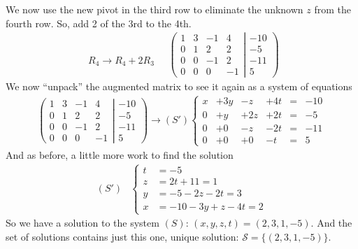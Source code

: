 We now use the new pivot in the third row to eliminate the unknown $z$ from the fourth
row. So, add 2 of the 3rd to the 4th.
\begin{align*}
\begin{array}{l}
   \\
   \\
   \\
 R_4 \to R_4 + 2R_3
\end{array}
\quad
\left(
	\begin{matrix}
	   1 &   3 & -1 &   4 \\
	   0 &   1 &  2 &   2 \\
	   0 &   0 & -1 &   2 \\
	   0 &   0 &  0 &  -1
	\end{matrix}
  \left|
	\begin{matrix}
	 -10 \\
	  -5 \\
	 -11 \\
	   5
	\end{matrix}
  \right.
\right)
\end{align*}
We now ``unpack'' the augmented matrix to see it again as a system of equations
\begin{align*}
\left(
	\begin{matrix}
	   1 &   3 & -1 &   4 \\
	   0 &   1 &  2 &   2 \\
	   0 &   0 & -1 &   2 \\
	   0 &   0 &  0 &  -1
	\end{matrix}
  \left|
	\begin{matrix}
	 -10 \\
	  -5 \\
	 -11 \\
	   5
	\end{matrix}
  \right.
\right)
\longrightarrow
(S')
\left\{
\begin{matrix}
    x &+ 3y &-  z &+ 4t &=&  -10 \\
    0 &+  y &+ 2z &+ 2t &=&   -5 \\
    0 &+  0 &-  z &- 2t &=&  -11 \\
    0 &+  0 &+  0 &-  t &=&    5
\end{matrix}
\right.
\end{align*}
And as before, a little more work to find the solution
\begin{align*}
(S')
&\left\{
\begin{array}{ll}
   t &=  -5 \\
   z &=  2t +11 = 1\\
   y &=  -5 -2z - 2t = 3\\
   x &= -10 -3y + z - 4t = 2 	
\end{array}
\right. 
\end{align*}
So we have a solution to the system $(S)$: $(x,y,z,t)=(2,3,1,-5)$. And the set of solutions contains just this one, unique solution: $\mathcal{S}=\{(2,3,1,-5)\}$.


